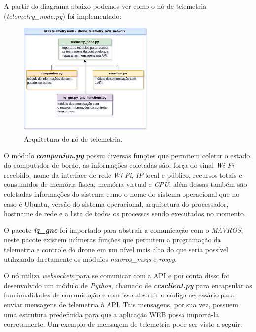 \documentclass[12pt,a4paper,oneside]{book}
\begin{document}
A partir do diagrama abaixo podemos ver como o nó de telemetria (\textit{telemetry\_node.py}) foi implementado:
%
\begin{figure}[H]
  \centering
  \includegraphics[width=0.6\textwidth]{Images/Desenvolvimento/telemetry_arq.png}
  \caption{Arquitetura do nó de telemetria.}
  \label{fig:telemetry_arq.png.0}
\end{figure}
%

O módulo \textbf{\textit{companion.py}} possui diversas funções que permitem coletar o estado do computador de bordo, as informações coletadas são: força do sinal \textit{Wi-Fi} recebido, nome da interface de rede \textit{Wi-Fi}, \textit{IP} local e público, recursos totais e consumidos de memória física, memória virtual e \textit{CPU}, além dessas também são coletadas informações do sistema como o nome do sistema operacional que no caso é Ubuntu, versão do sistema operacional, arquitetura do processador, hostname de rede e a lista de todos os processos sendo executados no momento.  

O pacote \textbf{\textit{iq\_gnc}} foi importado para abstrair a comunicação com o \textit{MAVROS}, neste pacote existem inúmeras funções que permitem a programação da telemetria e controle do drone em um nível mais alto do que seria possível utilizando diretamente os módulos \textit{mavros\_msgs} e \textit{rospy}.

O nó utiliza \textit{websockets} para se comunicar com a API e por conta disso foi desenvolvido um módulo de \textit{Python}, chamado de \textbf{\textit{ccsclient.py}} para encapsular as funcionalidades de comunicação e com isso abstrair o código necessário para enviar mensagens de telemetria à API. Tais mensagens, por sua vez, possuem uma estrutura predefinida para que a aplicação WEB possa importá-la corretamente. Um exemplo de mensagem de telemetria pode ser visto a seguir:
\end{document}
